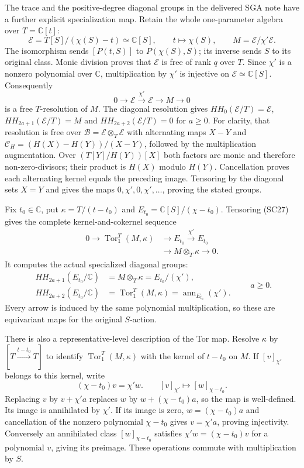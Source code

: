 The trace and the positive-degree diagonal groups in the delivered
SGA note have a further explicit specialization map.  Retain the
whole one-parameter algebra over $T=\mathbb C[t]$:
\[
 \mathscr E=T[S]/(\chi(S)-t)\simeq\mathbb C[S],
 \qquad t\longmapsto\chi(S),\qquad
 M=\mathscr E/\chi'\mathscr E.
 \tag{SC26}
\]
The isomorphism sends $[P(t,S)]$ to $P(\chi(S),S)$; its inverse
sends $S$ to its original class.  Monic division proves that
$\mathscr E$ is free of rank $q$ over $T$.  Since $\chi'$ is a
nonzero polynomial over $\mathbb C$, multiplication by $\chi'$
is injective on $\mathscr E\simeq\mathbb C[S]$.  Consequently
\[
 0\longrightarrow\mathscr E\xrightarrow{\chi'}\mathscr E
   \longrightarrow M\longrightarrow0
 \tag{SC27}
\]
is a free $T$-resolution of $M$.  The diagonal resolution gives
$HH_0(\mathscr E/T)=\mathscr E$,
$HH_{2a+1}(\mathscr E/T)=M$ and
$HH_{2a+2}(\mathscr E/T)=0$ for $a\geq0$.
For clarity, that resolution is free over
$\mathscr B=\mathscr E\otimes_T\mathscr E$ with alternating maps
$X-Y$ and $\mathcal C_H=(H(X)-H(Y))/(X-Y)$, followed by
the multiplication augmentation.  Over
$(T[Y]/H(Y))[X]$ both factors are monic and therefore
non-zero-divisors; their product is $H(X)$ modulo $H(Y)$.
Cancellation proves each alternating kernel equals the preceding
image.  Tensoring by the diagonal sets $X=Y$ and gives the maps
$0,\chi',0,\chi',\ldots$, proving the stated groups.

Fix $t_0\in\mathbb C$, put $\kappa=T/(t-t_0)$ and
$E_{t_0}=\mathbb C[S]/(\chi-t_0)$.  Tensoring (SC27) gives the
complete kernel-and-cokernel sequence
\[
\begin{split}
0\longrightarrow\operatorname{Tor}_1^T(M,\kappa)
 &\longrightarrow E_{t_0}\xrightarrow{\chi'} E_{t_0}\\
 &\longrightarrow M\otimes_T\kappa\longrightarrow0.
\end{split}\tag{SC28}
\]
It computes the actual specialized diagonal groups:
\[
 \begin{split}
 HH_{2a+1}(E_{t_0}/\mathbb C)&=M\otimes_T\kappa
                              =E_{t_0}/(\chi'),\\
 HH_{2a+2}(E_{t_0}/\mathbb C)&=\operatorname{Tor}_1^T(M,\kappa)
                              =\operatorname{ann}_{E_{t_0}}(\chi').
 \end{split}\qquad a\geq0.
 \tag{SC29}
\]
Every arrow is induced by the same polynomial multiplication,
so these are equivariant maps for the original $S$-action.

There is also a representative-level description of the Tor map.
Resolve $\kappa$ by $[T\xrightarrow{t-t_0}T]$ to identify
$\operatorname{Tor}_1^T(M,\kappa)$ with the kernel of $t-t_0$ on
$M$.  If $[v]_{\chi'}$ belongs to this kernel, write
\[
  (\chi-t_0)v=\chi'w.
  \qquad [v]_{\chi'}\longmapsto[w]_{\chi-t_0}.
 \tag{SC30}
\]
Replacing $v$ by $v+\chi'a$ replaces $w$ by $w+(\chi-t_0)a$,
so the map is well-defined.  Its image is annihilated by $\chi'$.
If its image is zero, $w=(\chi-t_0)a$ and cancellation of the
nonzero polynomial $\chi-t_0$ gives $v=\chi'a$, proving
injectivity.  Conversely an annihilated class $[w]_{\chi-t_0}$
satisfies $\chi'w=(\chi-t_0)v$ for a polynomial $v$, giving its
preimage.  These operations commute with multiplication by $S$.

